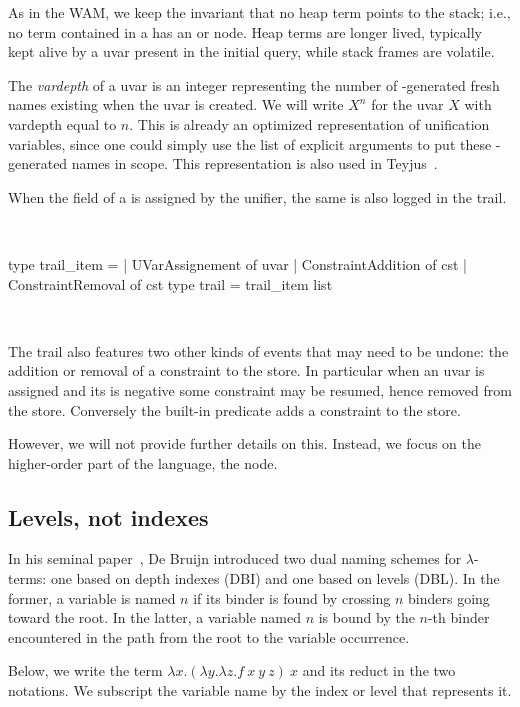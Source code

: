 \documentclass[a4paper, 11pt]{book}
\newenvironment{ocamlcode}
  {\VerbatimEnvironment~\\\begin{ocamlbox}\begin{xocamlcode}}{\end{xocamlcode}
\end{ocamlbox}\\}
\begin{document}
As in the WAM, we keep the invariant that no heap term points to the stack;
i.e., no term contained in a  has an  or
 node. Heap terms are longer lived, typically kept alive by a
uvar present in the initial query, while stack frames are volatile.


The \emph{vardepth} of a uvar is an integer representing the number of
-generated fresh names existing when the uvar is created. We will
write $X^n$ for the uvar $X$ with vardepth equal to $n$. This is already an
optimized representation of unification variables, since one could simply use
the list of explicit arguments to put these -generated names in
scope. This representation is also used in
Teyjus~\cite{DBLP:journals/corr/abs-0911-5203}.


When the  field of a  is assigned by the unifier,
the same  is also logged in the trail.

\begin{ocamlcode}
type trail_item =
| UVarAssignement of uvar
| ConstraintAddition of cst
| ConstraintRemoval  of cst
type trail = trail_item list
\end{ocamlcode}

\noindent
The trail also features two other kinds of events that may need to be undone:
the addition or removal of a constraint to the store. In particular when
an uvar is assigned and its  is negative some constraint may
be resumed, hence removed from the store. Conversely the
 built-in predicate adds a constraint to the store.

However, we will not
provide further details on this. Instead, we focus on the higher-order part of
the language, the  node.

\subsection{Levels, not indexes}\label{sec:dbl}


In his seminal paper~\cite{DEBRUIJN1994375}, De Bruijn introduced two dual
naming schemes for $\lambda$-terms: one based on depth indexes (DBI) and one
based on levels (DBL). In the former, a variable is named $n$ if its binder is
found by crossing $n$ binders going toward the root. In the latter, a variable
named $n$ is bound by the $n$-th binder encountered in the path from the root
to the variable occurrence.


Below, we write the term $\lambda x.(\lambda y.\lambda z.f\ x\ y\ z)\ x$ and its
reduct in the two notations. We subscript the variable name by the index or
level that represents it.\\
\end{document}
